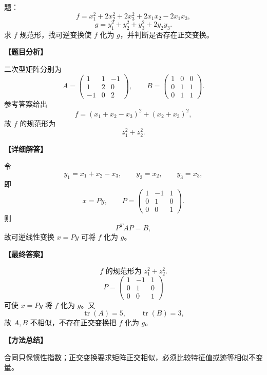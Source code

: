 ﻿\documentclass[11pt,a4paper,UTF8]{ctexart}
\begin{document}
\begin{answerbox}
题：
\[f=x_1^2+2x_2^2+2x_3^2+2x_1x_2-2x_1x_3,\]
\[g=y_1^2+y_2^2+y_3^2+2y_2y_3.\]
求 $f$ 规范形，找可逆变换使 $f$ 化为 $g$，并判断是否存在正交变换。

\textbf{【题目分析】}

二次型矩阵分别为
\[
A=\begin{pmatrix}1&1&-1\\1&2&0\\-1&0&2\end{pmatrix},
\qquad
B=\begin{pmatrix}1&0&0\\0&1&1\\0&1&1\end{pmatrix}.
\]
参考答案给出
\[
f=(x_1+x_2-x_3)^2+(x_2+x_3)^2,
\]
故 \(f\) 的规范形为
\[
z_1^2+z_2^2.
\]

\textbf{【详细解答】}

令
\[
y_1=x_1+x_2-x_3,\qquad y_2=x_2,\qquad y_3=x_3,
\]
即
\[
x=Py,\qquad
P=
\begin{pmatrix}
1&-1&1\\
0&1&0\\
0&0&1
\end{pmatrix}.
\]
则
\[
P^TAP=B,
\]
故可逆线性变换 \(x=Py\) 可将 \(f\) 化为 \(g\)。

\textbf{【最终答案】}

\[
f\text{ 的规范形为 }z_1^2+z_2^2.
\]
\[
P=
\begin{pmatrix}
1&-1&1\\
0&1&0\\
0&0&1
\end{pmatrix}
\]
可使 \(x=Py\) 将 \(f\) 化为 \(g\)。又
\[
\operatorname{tr}(A)=5,\qquad \operatorname{tr}(B)=3,
\]
故 \(A,B\) 不相似，不存在正交变换把 \(f\) 化为 \(g\)。

\textbf{【方法总结】}

合同只保惯性指数；正交变换要求矩阵正交相似，必须比较特征值或迹等相似不变量。
\end{answerbox}
\end{document}
